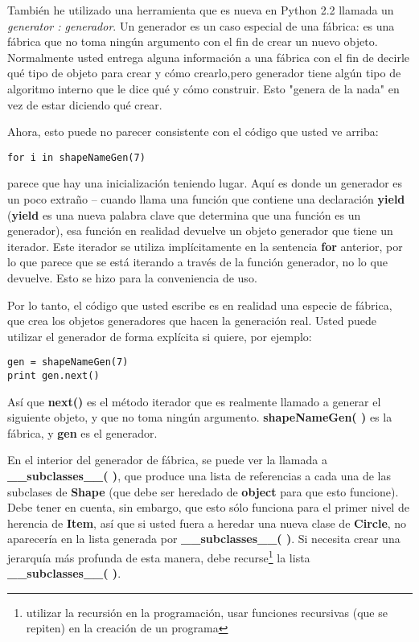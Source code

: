 También he utilizado una herramienta que es nueva en Python 2.2 llamada un \textit{generator : generador}. Un generador es un caso especial de una fábrica: es una fábrica que no toma ningún argumento con el fin de crear un nuevo objeto. Normalmente usted entrega alguna información a una fábrica con el fin de decirle qué tipo de objeto para crear y cómo crearlo,pero generador tiene algún tipo de algoritmo interno que le dice qué y cómo construir. Esto "genera de la nada" en vez de estar diciendo qué crear. \newline

Ahora, esto puede no parecer consistente con el código que usted ve arriba:     \newline

\begin{lstlisting} 
for i in shapeNameGen(7)
\end{lstlisting}

parece que hay una inicialización teniendo lugar. Aquí es donde un generador es un poco extraño – cuando llama una función que contiene una declaración \textbf{yield} (\textbf{yield} es una nueva palabra clave que determina que una función es un generador), esa función en realidad devuelve un objeto generador que tiene un iterador. Este iterador se utiliza implícitamente en la sentencia \textbf{for} anterior, por lo que parece que se está iterando a través de la función generador, no lo que devuelve. Esto se hizo para la conveniencia de uso.    \newline

Por lo tanto, el código que usted escribe es en realidad una especie de fábrica, que crea los objetos generadores que hacen la generación real. Usted puede utilizar el generador de forma explícita si quiere, por ejemplo:    \newline

\begin{lstlisting} 
gen = shapeNameGen(7) 
print gen.next() 
\end{lstlisting}

Así que \textbf{next()} es el método iterador que es realmente llamado a generar el siguiente objeto, y que no toma ningún argumento. \textbf{shapeNameGen( )} es la fábrica, y \textbf{gen} es el generador.     \newline

En el interior del generador de fábrica, se puede ver la llamada a \textbf{\_\_subclasses\_\_( )}, que produce una lista de referencias a cada una de las subclases de \textbf{Shape} (que debe ser heredado de \textbf{object} para que esto funcione). Debe tener en cuenta, sin embargo, que esto sólo funciona para el primer nivel de herencia de \textbf{Item}, así que si usted fuera a heredar una nueva clase de \textbf{Circle}, no aparecería en la lista generada por \textbf{\_\_subclasses\_\_( )}. Si necesita crear una jerarquía más profunda de esta manera, debe recurse\footnote{utilizar la recursión en la programación, usar funciones recursivas (que se repiten) en la creación de un programa} la lista \textbf{\_\_subclasses\_\_( )}.   \newline

